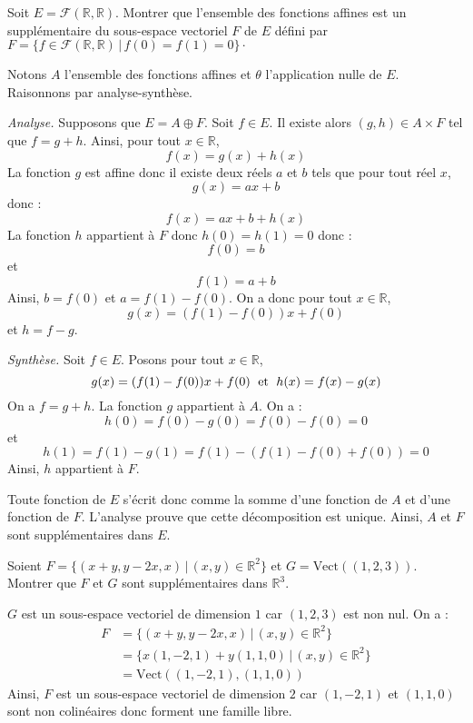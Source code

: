 \documentclass[a4paper,twoside,french,11pt]{VcCours}
\begin{document}
\begin{Exercice}{} Soit $E = \mathcal{F}(\mathbb{R}, \mathbb{R})$. Montrer que l'ensemble des fonctions affines est un supplémentaire du sous-espace vectoriel $F$ de $E$ défini par $F = \lbrace f \in \mathcal{F}(\mathbb{R}, \mathbb{R}) \, \vert \, f(0)=f(1)=0 \rbrace\cdot$
\end{Exercice}

\corr Notons $A$ l'ensemble des fonctions affines et $\theta$ l'application nulle de $E$. Raisonnons par analyse-synthèse.

\medskip

\textit{Analyse.} Supposons que $E = A \oplus F$. Soit $f \in E$. Il existe alors $(g,h) \in A \times F$ tel que $f=g+h$. Ainsi, pour tout $x \in \mathbb{R}$,
$$ f(x) =g(x)+h(x)$$
La fonction $g$ est affine donc il existe deux réels $a$ et $b$ tels que pour tout réel $x$,
$$ g(x) = ax+b$$
donc :
$$ f(x) = ax+b + h(x)$$
La fonction $h$ appartient à $F$ donc $h(0)=h(1)=0$ donc :
$$ f(0) = b$$
et 
$$ f(1) = a+b$$
Ainsi, $b=f(0)$ et $a=f(1)-f(0)$. On a donc pour tout $x \in \mathbb{R}$,
$$ g(x) = (f(1)-f(0))x + f(0)$$
et $h=f-g$.

\medskip

\textit{Synthèse.} Soit $f \in E$. Posons pour tout $x \in \mathbb{R}$,
$$ g(x) = (f(1)-f(0))x + f(0) \; \hbox{ et } \; h(x)=f(x)-g(x)$$
On a $f=g+h$. La fonction $g$ appartient à $A$. On a :
$$ h(0) = f(0)-g(0) = f(0)-f(0)=0$$
et
$$ h(1) = f(1)-g(1) = f(1)- (f(1)-f(0)+f(0))= 0$$
Ainsi, $h$ appartient à $F$.

\medskip

Toute fonction de $E$ s'écrit donc comme la somme d'une fonction de $A$ et d'une fonction de $F$. L'analyse prouve que cette décomposition est unique. Ainsi, $A$ et $F$ sont supplémentaires dans $E$.

\begin{Exercice}{} Soient $F= \lbrace (x+y,y-2x, x) \, \vert \,  (x,y) \in \mathbb{R}^2 \rbrace$ et $G = \textrm{Vect}((1,2,3))$. Montrer que $F$ et $G$ sont supplémentaires dans $\mathbb{R}^3$.
\end{Exercice} 

\corr $G$ est un sous-espace vectoriel de dimension $1$ car $(1,2,3)$ est non nul. On a :
\begin{align*}
F & = \lbrace (x+y,y-2x, x) \, \vert \,  (x,y) \in \mathbb{R}^2 \rbrace \\
& = \lbrace x (1,-2,1) + y (1,1,0) \, \vert \, (x,y) \in \mathbb{R}^2 \rbrace \\
& = \textrm{Vect}((1,-2,1),(1,1,0)) 
\end{align*}
Ainsi, $F$ est un sous-espace vectoriel de dimension $2$ car $(1,-2,1)$ et $(1,1,0)$ sont non colinéaires donc forment une famille libre.
\end{document}
